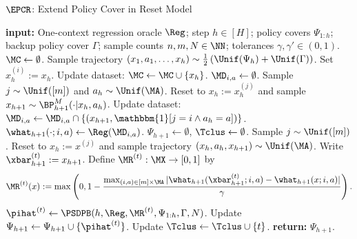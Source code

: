 \begin{algorithm}[!htb]
	\caption{$\EPCR$: Extend Policy Cover in Reset Model}
	\label{alg:epcr}
	\begin{algorithmic}[1]\onehalfspacing
          \State \textbf{input:} One-context regression oracle $\Reg$; step $h \in [H]$; policy covers $\Psi_{1:h}$; backup policy cover $\Gamma$; sample counts $n,m,N\in\NN$; tolerances $\gamma,\gamma' \in (0,1)$.
        \State $\MC \gets \emptyset$.
            \State Sample trajectory $(x_1,a_1,\dots,x_h) \sim \frac{1}{2}\left(\Unif(\Psi_h) + \Unif(\Gamma)\right)$.
            \State Set $x_h^{(i)} := x_h$.
            \State Update dataset: $\MC \gets \MC \cup \{x_h\}$.
        \EndFor
                \State $\MD_{i,a} \gets \emptyset$.
                    \State Sample $j \sim \Unif([m])$ and $a_h \sim \Unif(\MA)$.
                    \State Reset to $x_h := x_h^{(j)}$ and sample $x_{h+1} \sim \BP^M_{h+1}(\cdot|x_h, a_h)$.
                    \State Update dataset: $\MD_{i,a} \gets \MD_{i,a} \cap \{(x_{h+1}, \mathbbm{1}[j=i \land a_h = a])\}$.
                \EndFor
                \State $\what_{h+1}(\cdot;i,a) \gets \Reg(\MD_{i,a})$. 
            \EndFor
        \EndFor
        \State $\Psi_{h+1} \gets \emptyset$, $\Tclus \gets \emptyset$.
            \State Sample $j \sim \Unif([m])$.
            \State Reset to $x_h := x^{(j)}$ and sample trajectory $(x_h,a_h,x_{h+1}) \sim \Unif(\MA)$. Write $\xbar_{h+1}^{(t)} := x_{h+1}$.
            \State Define $\MR^{(t)}: \MX \to [0,1]$ by 
            \[\MR^{(t)}(x) := \max\left(0, 1-\frac{\max_{(i,a) \in [m]\times\MA} |\what_{h+1}(\xbar_{h+1}^{(t)};i,a) - \what_{h+1}(x;i,a)|}{\gamma}\right).\] \label{line:rt-def}
            \label{line:cluster-test}
                \State $\pihat^{(t)} \gets \PSDPB(h, \Reg, \MR^{(t)}, \Psi_{1:h},\Gamma, N)$.\label{line:psdp-call}
                \State Update $\Psi_{h+1} \gets \Psi_{h+1} \cup \{\pihat^{(t)}\}$.
                \State Update $\Tclus \gets \Tclus \cup \{t\}$.
            \EndIf
        \EndFor 
        \State \textbf{return:} $\Psi_{h+1}$.
	\end{algorithmic}
\end{algorithm}

